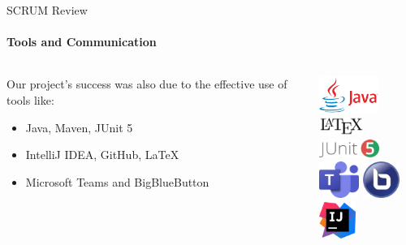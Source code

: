 \documentclass[
ngerman,%
authorontitle=true,
]{bfhbeamer}
\begin{document}
	\begin{frame}{SCRUM Review}
		\framesubtitle{Tools and Communication}
		
		\begin{columns}
			\begin{column}{0.6\textwidth}
				Our project's success was also due to the effective use of tools like:
				\begin{itemize}
					\item Java, Maven, JUnit 5
					\item IntelliJ IDEA, GitHub, LaTeX
					\item Microsoft Teams and BigBlueButton
				\end{itemize}
			\end{column}
			\begin{column}{0.4\textwidth}
				\centering
				\includegraphics[height=1.2cm]{pictures/Java-Logo}\\
				\vspace{1em}
				\includegraphics[height=0.6cm]{pictures/LaTeX_logo}
				\vspace{1em}
				\includegraphics[height=0.6cm]{pictures/JUnit_5_Logo}\\
				\vspace{1em}
				\includegraphics[height=1.2cm]{pictures/final_presentation/MS-Teams_Logo}
				\vspace{1em}
				\includegraphics[height=1.2cm]{pictures/final_presentation/BigBlueButton_icon}\\
				\vspace{1em}
				\includegraphics[height=1.2cm]{pictures/IntelliJ_IDEA_Icon}
			\end{column}
		\end{columns}
	\end{frame}
	
\end{document}
